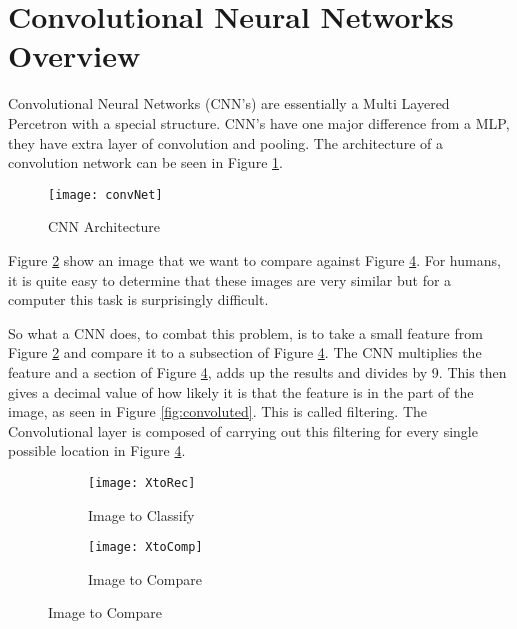 \section{Convolutional Neural Networks Overview}
Convolutional Neural Networks (CNN's) are essentially a Multi Layered Percetron with a
special structure. CNN's have one major difference from a MLP, they have extra
layer of convolution and pooling. The architecture of a convolution network can
be seen in Figure \ref{fig:convNet}.

\begin{figure}
	\texttt{[image: convNet]}
	\caption{CNN Architecture}
	\label{fig:convNet}
\end{figure}

Figure \ref{fig:XtoRec} show an image that we want to compare against
Figure \ref{fig:XtoComp}.
For humans, it is quite easy to determine that these images are very similar but
for a computer this task is surprisingly difficult.

So what a CNN does, to combat this problem, is to take a small feature from
Figure \ref{fig:XtoRec} and compare it to a subsection of Figure \ref{fig:XtoComp}.
The CNN multiplies the feature and a section of Figure \ref{fig:XtoComp}, adds
up the results and divides by 9. This then gives a decimal value of how likely
it is that the feature is in the part of the image, as seen in Figure
\ref{fig:convoluted}.
This is called filtering. The Convolutional layer is composed of carrying out
this filtering for every single possible location in Figure \ref{fig:XtoComp}.
\begin{figure}
	\caption{Image filtering}
    \label{fig:filter}
      \begin{subfigure}[b]{0.4\textwidth}
          \texttt{[image: XtoRec]}
          \caption{Image to Classify}
          \label{fig:XtoRec}
      \end{subfigure}
      \begin{subfigure}[b]{0.4\textwidth}
      \texttt{[image: XtoComp]}
      \caption{Image to Compare}
      \label{fig:XtoComp}
      \end{subfigure}
\end{figure}

